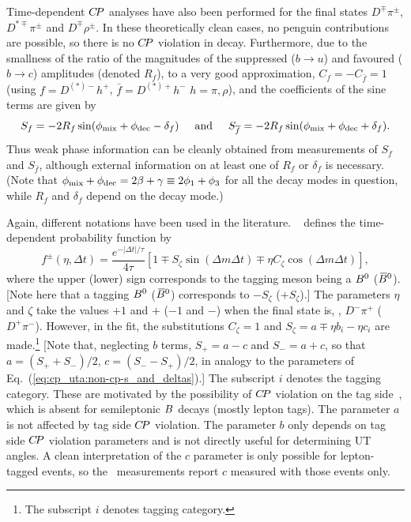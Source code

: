Time-dependent $C\!P$ analyses have also been performed for the
final states $D^{\mp}\pi^{\pm}$, $D^{*\mp}\pi^{\pm}$ and $D^{\mp}\rho^{\pm}$.
In these theoretically clean cases, no penguin contributions are possible,
so there is no $C\!P$ violation in decay.
Furthermore, due to the smallness of the ratio of the magnitudes of the 
suppressed ($b \to u$) and favoured ($b \to c$) amplitudes (denoted $R_f$),
to a very good approximation, $C_f = - C_{\bar{f}} = 1$
(using $f = D^{(*)-}h^+$, $\bar{f} = D^{(*)+}h^-$ $h = \pi,\rho$),
and the coefficients of the sine terms are given by
\begin{equation}
  S_f = - 2 R_f \sin( \phi_{\rm mix} + \phi_{\rm dec} - \delta_f )
  \hspace{5mm}
  {\rm and}
  \hspace{5mm}
  S_{\bar{f}} = - 2 R_f \sin( \phi_{\rm mix} + \phi_{\rm dec} + \delta_f ).
\end{equation}
Thus weak phase information can be cleanly obtained from measurements
of $S_f$ and $S_{\bar{f}}$, 
although external information on at least one of $R_f$ or $\delta_f$ is necessary.
(Note that $\phi_{\rm mix} + \phi_{\rm dec} = 2\beta + \gamma \equiv 2\phi_1 + \phi_3$ for all the decay modes 
in question, while $R_f$ and $\delta_f$ depend on the decay mode.)

Again, different notations have been used in the literature.
\babar~\cite{Aubert:2006tw,Aubert:2005yf}
defines the time-dependent probability function by
\begin{equation}
  f^\pm (\eta, \Delta t) = \frac{e^{-|\Delta t|/\tau}}{4\tau} 
  \left[  
    1 \mp S_\zeta \sin (\Delta m \Delta t) \mp \eta C_\zeta \cos(\Delta m \Delta t) 
  \right],
\end{equation} 
where the upper (lower) sign corresponds to 
the tagging meson being a $B^0$ ($\kern 0.18em\overline{\kern -0.18em B}{}^0$). 
[Note here that a tagging $B^0$ ($\kern 0.18em\overline{\kern -0.18em B}{}^0$) corresponds to $-S_\zeta$ ($+S_\zeta$).]
The parameters $\eta$ and $\zeta$ take the values $+1$ and $+$ ($-1$ and $-$) 
when the final state is, \eg, $D^-\pi^+$ ($D^+\pi^-$). 
However, in the fit, the substitutions $C_\zeta = 1$ and 
$S_\zeta = a \mp \eta b_i - \eta c_i$ are made.\footnote{
  The subscript $i$ denotes tagging category.
}
[Note that, neglecting $b$ terms, $S_+ = a - c$ and $S_- = a + c$, 
so that $a = (S_+ + S_-)/2$, $c = (S_- - S_+)/2$, in analogy to 
the parameters of Eq.~(\ref{eq:cp_uta:non-cp-s_and_deltas}).] 
The subscript $i$ denotes the tagging category. 
These are motivated by the possibility of 
$C\!P$ violation on the tag side~\cite{Long:2003wq}, 
which is absent for semileptonic $B$ decays (mostly lepton tags). 
The parameter $a$ is not affected by tag side $C\!P$ violation. 
The parameter $b$ only depends on tag side $C\!P$ violation parameters 
and is not directly useful for determining UT angles.
A clean interpretation of the $c$ parameter is only possible for 
lepton-tagged events,
so the \babar\ measurements report $c$ measured with those events only.

